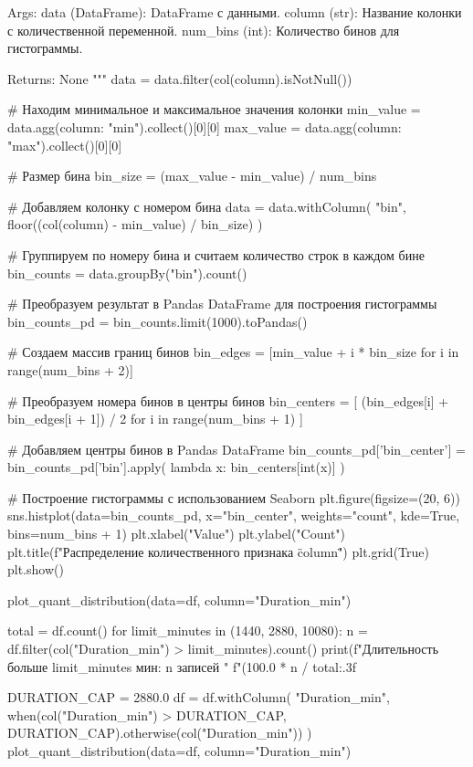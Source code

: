 \begin{code}
    Args:
        data (DataFrame): DataFrame с данными.
        column (str): Название колонки с количественной переменной.
        num_bins (int): Количество бинов для гистограммы.

    Returns:
        None
    """
    data = data.filter(col(column).isNotNull())

    # Находим минимальное и максимальное значения колонки
    min_value = data.agg({column: "min"}).collect()[0][0]
    max_value = data.agg({column: "max"}).collect()[0][0]

    # Размер бина
    bin_size = (max_value - min_value) / num_bins

    # Добавляем колонку с номером бина
    data = data.withColumn(
        "bin",
        floor((col(column) - min_value) / bin_size)
    )

    # Группируем по номеру бина и считаем количество строк в каждом бине
    bin_counts = data.groupBy("bin").count()

    # Преобразуем результат в Pandas DataFrame для построения гистограммы
    bin_counts_pd = bin_counts.limit(1000).toPandas()
    
    # Создаем массив границ бинов
    bin_edges = [min_value + i * bin_size for i in range(num_bins + 2)]
    
    # Преобразуем номера бинов в центры бинов
    bin_centers = [
        (bin_edges[i] + bin_edges[i + 1]) / 2 for i in range(num_bins + 1)
    ]
    
    # Добавляем центры бинов в Pandas DataFrame
    bin_counts_pd['bin_center'] = bin_counts_pd['bin'].apply(
        lambda x: bin_centers[int(x)]
    )
    
    # Построение гистограммы с использованием Seaborn
    plt.figure(figsize=(20, 6))
    sns.histplot(data=bin_counts_pd, x="bin_center",
                 weights="count", kde=True, bins=num_bins + 1)
    plt.xlabel("Value")
    plt.ylabel("Count")
    plt.title(f"Распределение количественного признака \"{column}\"")
    plt.grid(True)
    plt.show()

plot_quant_distribution(data=df, column="Duration_min")

total = df.count()
for limit_minutes in (1440, 2880, 10080):
    n = df.filter(col("Duration_min") > limit_minutes).count()
    print(f"Длительность больше {limit_minutes} мин: {n} записей "
          f"({100.0 * n / total:.3f}%

DURATION_CAP = 2880.0
df = df.withColumn(
    "Duration_min",
    when(col("Duration_min") > DURATION_CAP, DURATION_CAP).otherwise(col("Duration_min"))
)
plot_quant_distribution(data=df, column="Duration_min")


\end{code}
